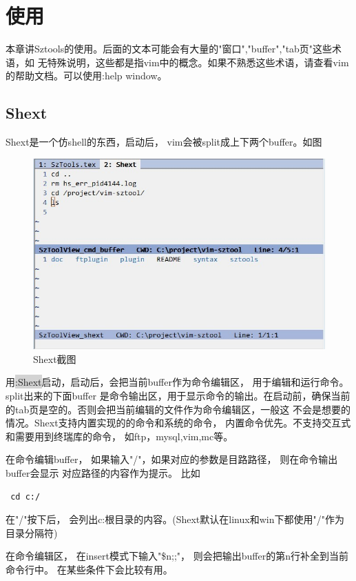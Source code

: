 \documentclass[oneside,openany]{book}
\begin{document}
\chapter{使用}
  本章讲Sztools的使用。后面的文本可能会有大量的"窗口","buffer","tab页"这些术语，如
无特殊说明，这些都是指vim中的概念。如果不熟悉这些术语，请查看vim的帮助文档。可以使用:help window。

  \section{Shext}
  Shext是一个仿shell的东西，启动后， vim会被split成上下两个buffer。如图
  \begin{figure}[htbp]%
  \centering
  \includegraphics[scale=0.5]{shext.jpg}
  \caption{Shext截图}
  \end{figure}
  

  用\colorbox{lightgray}{:Shext}启动，启动后，会把当前buffer作为命令编辑区， 用于编辑和运行命令。 split出来的下面buffer
是命令输出区，用于显示命令的输出。在启动前，确保当前的tab页是空的。否则会把当前编辑的文件作为命令编辑区，一般这
不会是想要的情况。Shext支持内置实现的的命令和系统的命令， 内置命令优先。不支持交互式和需要用到终瑞库的命令， 如ftp，mysql,vim,mc等。 

  在命令编辑buffer， 如果输入"/"，如果对应的参数是目路路径， 则在命令输出buffer会显示
对应路径的内容作为提示。 比如 
  \begin{verbatim} cd c:/ \end{verbatim}
 在"/"按下后， 会列出c:根目录的内容。(Shext默认在linux和win下都使用"/"作为目录分隔符)

  在命令编辑区， 在insert模式下输入"\$n;;"， 则会把输出buffer的第n行补全到当前命令行中。
在某些条件下会比较有用。
\end{document}

